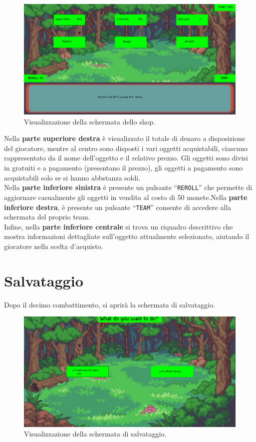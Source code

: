 \documentclass[a4paper,12pt]{report}
\begin{document}
{{\begin{figure}[H]
  \centering
  \includegraphics[width=\textwidth]{immagini/schermataShop.png}
  \caption{Visualizzazione della schermata dello shop.}
  \label{fig:shop_screen}
\end{figure}
Nella \textbf{parte superiore destra} è visualizzato il totale di denaro a disposizione del giocatore, mentre al centro sono disposti i vari oggetti acquistabili, ciascuno rappresentato da il nome dell’oggetto e il relativo prezzo.
Gli oggetti sono divisi in gratuiti e a pagamento (presentano il prezzo), gli oggetti a pagamento sono acquistabili solo se si hanno abbstanza soldi.\\
Nella \textbf{parte inferiore sinistra} è presente un pulsante “\texttt{REROLL}” che permette di aggiornare casualmente gli oggetti in vendita al costo di 50 monete.Nella \textbf{parte inferiore destra}, è presente un pulsante “\texttt{TEAM}” consente di accedere alla schermata del proprio team.\\
Infine, nella \textbf{parte inferiore centrale} si trova un riquadro descrittivo che mostra informazioni dettagliate sull’oggetto attualmente selezionato, aiutando il giocatore nella scelta d’acquisto.

\section{Salvataggio}
Dopo il decimo combattimento, si aprirà la schermata di salvataggio.

\begin{figure}[H]
  \centering
  \includegraphics[width=\textwidth]{immagini/schermataSalvataggio.png}
  \caption{Visualizzazione della schermata di salvataggio.}
  \label{fig:save_screen}
\end{figure}

}}
\end{document}
